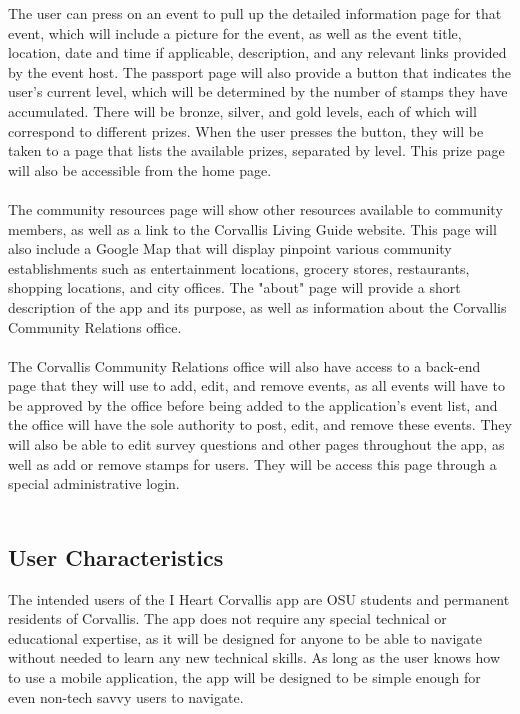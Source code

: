\documentclass[draftclsnofoot, onecolumn, 10pt, compsoc]{IEEEtran}
\begin{document}
			The user can press on an event to pull up the detailed information page for that event, which will include a picture for the event, as well as the event title, location, date and time if applicable, description, and any relevant links provided by the event host. The passport page will also provide a button that indicates the user's current level, which will be determined by the number of stamps they have accumulated. There will be bronze, silver, and gold levels, each of which will correspond to different prizes. When the user presses the button, they will be taken to a page that lists the available prizes, separated by level. This prize page will also be accessible from the home page. \\ \\
			The community resources page will show other resources available to community members, as well as a link to the Corvallis Living Guide website. This page will also include a Google Map that will display pinpoint various community establishments such as entertainment locations, grocery stores, restaurants, shopping locations, and city offices. The "about" page will provide a short description of the app and its purpose, as well as information about the Corvallis Community Relations office. \\ \\
			The Corvallis Community Relations office will also have access to a back-end page that they will use to add, edit, and remove events, as all events will have to be approved by the office before being added to the application's event list, and the office will have the sole authority to post, edit, and remove these events. They will also be able to edit survey questions and other pages throughout the app, as well as add or remove stamps for users. They will be access this page through a special administrative login. \\ \\
		
		\subsection{User Characteristics}
			The intended users of the I Heart Corvallis app are OSU students and permanent residents of Corvallis. The app does not require any special technical or educational expertise, as it will be designed for anyone to be able to navigate without needed to learn any new technical skills. As long as the user knows how to use a mobile application, the app will be designed to be simple enough for even non-tech savvy users to navigate.
		
\end{document}

